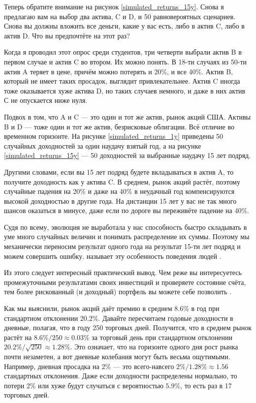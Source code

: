 Теперь обратите внимание на рисунок \ref{simulated_returns_15y}. Снова я
предлагаю вам на выбор два актива, C и D, и 50 равновероятных сценариев. Снова 
вы должны вложить все деньги, какие у вас есть, либо в актив C, либо в актив D.
Что вы предпочтёте на этот раз?

Когда я проводил этот опрос среди студентов, три четверти выбрали актив B в 
первом случае и актив C во втором. Их можно понять. В 18-ти случаях из 50-ти 
актив A теряет в цене, причём можно потерять и 20\%, и все 40\%. Актив B, 
который не имеет таких просадок, выглядит привлекательнее. Актив C иногда тоже 
оказывается хуже актива D, но таких случаев немного, и даже в них актив С не 
опускается ниже нуля.

Подвох в том, что A и C --- это один и тот же актив, рынок акций США. Активы B и 
D --- тоже один и тот же актив, безрисковые облигации. Всё отличие во временном 
горизонте. На рисунке \ref{simulated_returns_1y} приведены 50 случайных 
доходностей за один наудачу взятый год, а на рисунке \ref{simulated_returns_15y} 
--- 50 доходностей за выбранные наудачу 15 лет подряд.

Другими словами, если вы 15 лет подряд будете вкладываться в актив A, то 
получите доходность как у актива C. В среднем, рынок акций растёт, поэтому 
случайные падения на 20\% и даже на 40\% в неудачный год компенсируются высокой 
доходностью в другие года. На дистанции 15 лет у вас не так много шансов 
оказаться в минусе, даже если по дороге вы переживёте падение на 40\%.

Судя по всему, эволюция не выработала у нас способность быстро складывать в уме 
много случайных величин и понимать распределение их суммы. Поэтому мы 
механически переносим результат одного года на результат 15-ти лет подряд и 
можем совершить ошибку.  называет эту 
особенность поведения людей  \cite{benartzi1995myopic}.

Из этого следует интересный практический вывод. Чем реже вы интересуетесь 
промежуточными результатами своих инвестиций и проверяете состояние счёта, тем 
более рискованный (и доходный) портфель вы можете себе позволить 
\cite[ch.~20]{thaler2015misbehaving}.

Как мы выяснили, рынок акций даёт премию в среднем 8.6\% в год при стандартном 
отклонении 20.2\%. Давайте пересчитаем годовые доходности в дневные, полагая, 
что в году 250 торговых дней. Получится, что в среднем рынок растёт на
$8.6\% / 250 \approx 0.03\%$ за торговый день при стандартном отклонении $20.2\% 
/ \sqrt{250} \approx 1.28\%$. Это означает, что на горизонте одного дня рост 
рынка почти незаметен, а вот дневные колебания могут быть весьма ощутимыми. 
Например, дневная просадка на 2\% --- это всего-навсего $2\%/1.28\% \approx 1.56$ 
стандартных отклонения. Даже если доходности распределены нормально, то потери 
2\% или хуже будут случаться с вероятностью $5.9\%$, то есть раз в 17 торговых 
дней.

